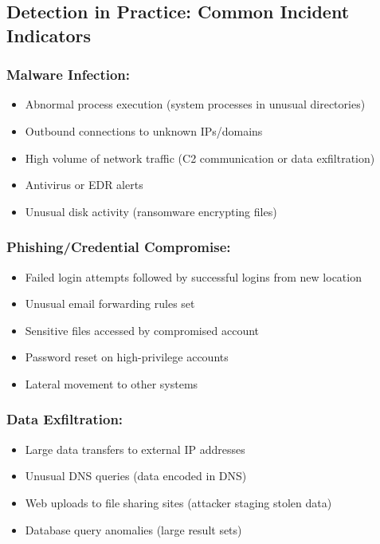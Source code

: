 \documentclass[10pt]{article}
\begin{document}
\subsection*{Detection in Practice: Common Incident Indicators}
\subsubsection*{Malware Infection:}
\begin{itemize}
  \item Abnormal process execution (system processes in unusual directories)
  \item Outbound connections to unknown IPs/domains
  \item High volume of network traffic (C2 communication or data exfiltration)
  \item Antivirus or EDR alerts
  \item Unusual disk activity (ransomware encrypting files)
\end{itemize}

\subsubsection*{Phishing/Credential Compromise:}
\begin{itemize}
  \item Failed login attempts followed by successful logins from new location
  \item Unusual email forwarding rules set
  \item Sensitive files accessed by compromised account
  \item Password reset on high-privilege accounts
  \item Lateral movement to other systems
\end{itemize}

\subsubsection*{Data Exfiltration:}
\begin{itemize}
  \item Large data transfers to external IP addresses
  \item Unusual DNS queries (data encoded in DNS)
  \item Web uploads to file sharing sites (attacker staging stolen data)
  \item Database query anomalies (large result sets)
\end{itemize}
\end{document}
